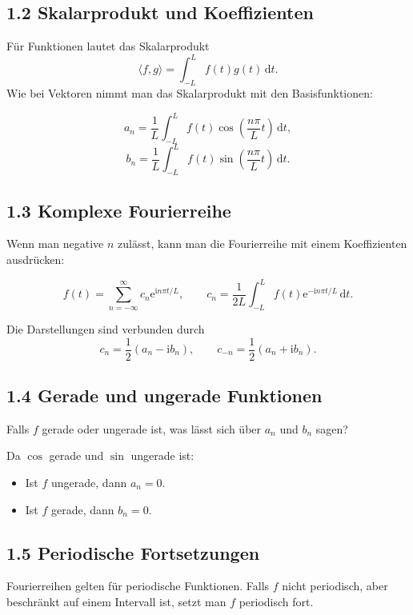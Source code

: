 \documentclass[11pt,a4paper]{article}
\newcommand{\ii}{\mathrm i}
\newcommand{\ee}{\mathrm e}
\newcommand{\dd}{\,\mathrm d}
\begin{document}
\subsection{1.2 Skalarprodukt und Koeffizienten}
Für Funktionen lautet das Skalarprodukt
\[
\langle f,g\rangle=\int_{-L}^{L}f(t)g(t)\dd t.
\]
Wie bei Vektoren nimmt man das Skalarprodukt mit den Basisfunktionen:
\begin{importantbox}
\[
a_n=\frac1L\int_{-L}^{L}f(t)\cos\left(\frac{n\pi}{L}t\right)\dd t,
\]
\[
b_n=\frac1L\int_{-L}^{L}f(t)\sin\left(\frac{n\pi}{L}t\right)\dd t.
\]
\end{importantbox}

\subsection{1.3 Komplexe Fourierreihe}
Wenn man negative $n$ zulässt, kann man die Fourierreihe mit einem Koeffizienten ausdrücken:
\begin{importantbox}
\[
f(t)=\sum_{n=-\infty}^{\infty}c_n\ee^{\ii n\pi t/L},
\qquad
c_n=\frac1{2L}\int_{-L}^{L}f(t)\ee^{-\ii n\pi t/L}\dd t.
\]
\end{importantbox}
Die Darstellungen sind verbunden durch
\[
c_n=\frac12(a_n-\ii b_n),
\qquad
c_{-n}=\frac12(a_n+\ii b_n).
\]

\subsection{1.4 Gerade und ungerade Funktionen}
\begin{fragebox}
Falls $f$ gerade oder ungerade ist, was lässt sich über $a_n$ und $b_n$ sagen?
\end{fragebox}
\begin{antwortbox}
Da $\cos$ gerade und $\sin$ ungerade ist:
\begin{itemize}
\item Ist $f$ ungerade, dann $a_n=0$.
\item Ist $f$ gerade, dann $b_n=0$.
\end{itemize}
\end{antwortbox}

\subsection{1.5 Periodische Fortsetzungen}
Fourierreihen gelten für periodische Funktionen. Falls $f$ nicht periodisch, aber beschränkt auf einem Intervall ist, setzt man $f$ periodisch fort.
\end{document}
